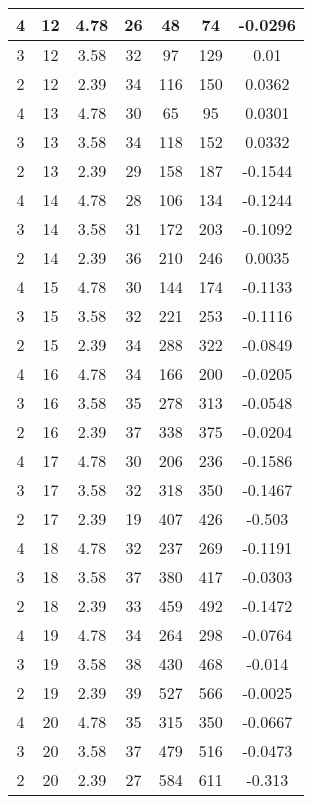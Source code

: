 \documentclass[letterpaper, 12pt]{article}
\begin{document}
\begin{longtable}{|c|c|c|c|c|c|c|}
\hline
4 & 12 & 4.78 & 26 & 48 & 74 & -0.0296 \\
\hline
3 & 12 & 3.58 & 32 & 97 & 129 & 0.01 \\
\hline
2 & 12 & 2.39 & 34 & 116 & 150 & 0.0362 \\
\hline
4 & 13 & 4.78 & 30 & 65 & 95 & 0.0301 \\
\hline
3 & 13 & 3.58 & 34 & 118 & 152 & 0.0332 \\
\hline
2 & 13 & 2.39 & 29 & 158 & 187 & -0.1544 \\
\hline
4 & 14 & 4.78 & 28 & 106 & 134 & -0.1244 \\
\hline
3 & 14 & 3.58 & 31 & 172 & 203 & -0.1092 \\
\hline
2 & 14 & 2.39 & 36 & 210 & 246 & 0.0035 \\
\hline
4 & 15 & 4.78 & 30 & 144 & 174 & -0.1133 \\
\hline
3 & 15 & 3.58 & 32 & 221 & 253 & -0.1116 \\
\hline
2 & 15 & 2.39 & 34 & 288 & 322 & -0.0849 \\
\hline
4 & 16 & 4.78 & 34 & 166 & 200 & -0.0205 \\
\hline
3 & 16 & 3.58 & 35 & 278 & 313 & -0.0548 \\
\hline
2 & 16 & 2.39 & 37 & 338 & 375 & -0.0204 \\
\hline
4 & 17 & 4.78 & 30 & 206 & 236 & -0.1586 \\
\hline
3 & 17 & 3.58 & 32 & 318 & 350 & -0.1467 \\
\hline
2 & 17 & 2.39 & 19 & 407 & 426 & -0.503 \\
\hline
4 & 18 & 4.78 & 32 & 237 & 269 & -0.1191 \\
\hline
3 & 18 & 3.58 & 37 & 380 & 417 & -0.0303 \\
\hline
2 & 18 & 2.39 & 33 & 459 & 492 & -0.1472 \\
\hline
4 & 19 & 4.78 & 34 & 264 & 298 & -0.0764 \\
\hline
3 & 19 & 3.58 & 38 & 430 & 468 & -0.014 \\
\hline
2 & 19 & 2.39 & 39 & 527 & 566 & -0.0025 \\
\hline
4 & 20 & 4.78 & 35 & 315 & 350 & -0.0667 \\
\hline
3 & 20 & 3.58 & 37 & 479 & 516 & -0.0473 \\
\hline
2 & 20 & 2.39 & 27 & 584 & 611 & -0.313 \\
\hline
\end{longtable}
\end{document}

